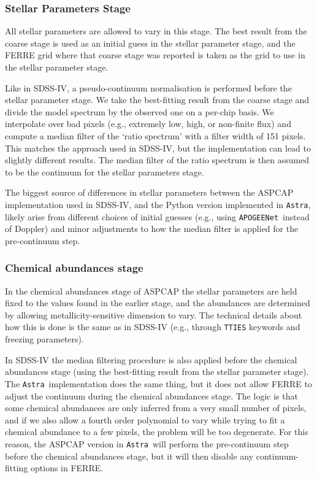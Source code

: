 \documentclass[modern]{aastex631}
\newcommand{\astra}{\texttt{Astra}}
\newcommand{\Astra}{\astra}
\newcommand{\pipeline}[1]{\texttt{#1}}
\newcommand{\APOGEENet}{\pipeline{APOGEENet}}
\begin{document}
\subsubsection{Stellar Parameters Stage}

All stellar parameters are allowed to vary in this stage. The best result from the coarse stage is used as an initial guess in the stellar parameter stage, and the FERRE grid where that coarse stage was reported is taken as the grid to use in the stellar parameter stage. 

Like in SDSS-IV, a pseudo-continuum normalisation is performed before the stellar parameter stage. We take the best-fitting result from the coarse stage and divide the model spectrum by the observed one on a per-chip basis. We interpolate over bad pixels (e.g., extremely low, high, or non-finite flux) and compute a median filter of the `ratio spectrum' with a filter width of 151 pixels. This matches the approach used in SDSS-IV, but the implementation can lead to slightly different results. The median filter of the ratio spectrum is then assumed to be the continuum for the stellar parameters stage. 

The biggest source of differences in stellar parameters between the ASPCAP implementation used in SDSS-IV, and the Python version implemented in \Astra, likely arise from different choices of initial guesses (e.g., using \APOGEENet\ instead of Doppler) and minor adjustments to how the median filter is applied for the pre-continuum step.

\subsubsection{Chemical abundances stage}


In the chemical abundances stage of ASPCAP the stellar parameters are held fixed to the values found in the earlier stage, and the abundances are determined by allowing metallicity-sensitive dimension to vary. The technical details about how this is done is the same as in SDSS-IV (e.g., through \texttt{TTIES} keywords and freezing parameters). 

In SDSS-IV the median filtering procedure is also applied before the chemical abundances stage (using the best-fitting result from the stellar parameter stage). The \Astra\ implementation does the same thing, but it does not allow FERRE to adjust the continuum during the chemical abundances stage. The logic is that some chemical abundances are only inferred from a very small number of pixels, and if we also allow a fourth order polynomial to vary while trying to fit a chemical abundance to a few pixels, the problem will be too degenerate. For this reason, the ASPCAP version in \Astra\ will perform the pre-continuum step before the chemical abundances stage, but it will then disable any continuum-fitting options in FERRE. 
\end{document}
